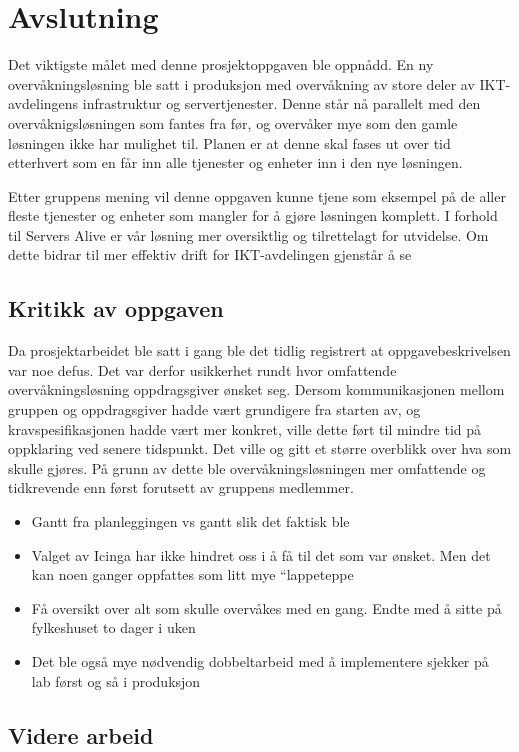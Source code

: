 \chapter{Avslutning}
Det viktigste målet med denne prosjektoppgaven ble oppnådd. En ny overvåkningsløsning ble satt i produksjon med overvåkning av store deler av IKT-avdelingens infrastruktur og servertjenester. Denne står nå parallelt med den overvåknigsløsningen som fantes fra før, og overvåker mye som den gamle løsningen ikke har mulighet til. Planen er at denne skal fases ut over tid etterhvert som en får inn alle tjenester og enheter inn i den nye løsningen. 

Etter gruppens mening vil denne oppgaven kunne tjene som eksempel på de aller fleste tjenester og enheter som mangler for å gjøre løsningen komplett. I forhold til Servers Alive er vår løsning mer oversiktlig og tilrettelagt for utvidelse. Om dette bidrar til mer effektiv drift for IKT-avdelingen gjenstår å se

\section{Kritikk av oppgaven}
Da prosjektarbeidet ble satt i gang ble det tidlig registrert at oppgavebeskrivelsen var noe defus. Det var derfor usikkerhet rundt hvor omfattende overvåkningsløsning oppdragsgiver ønsket seg. Dersom kommunikasjonen mellom gruppen og oppdragsgiver hadde vært grundigere fra starten av, og kravspesifikasjonen hadde vært mer konkret, ville dette ført til mindre tid på oppklaring ved senere tidspunkt. Det ville og gitt et større overblikk over hva som skulle gjøres. På grunn av dette ble overvåkningsløsningen mer omfattende og tidkrevende enn først forutsett av gruppens medlemmer.

\begin{itemize}
	\item Gantt fra planleggingen vs gantt slik det faktisk ble
	\item Valget av Icinga har ikke hindret oss i å få til det som var ønsket. Men det kan noen ganger oppfattes som litt mye “lappeteppe
	\item Få oversikt over alt som skulle overvåkes med en gang. Endte med å sitte på fylkeshuset to dager i uken
	\item Det ble også mye nødvendig dobbeltarbeid med å implementere sjekker på lab først og så i produksjon
\end{itemize}

\section{Videre arbeid}

